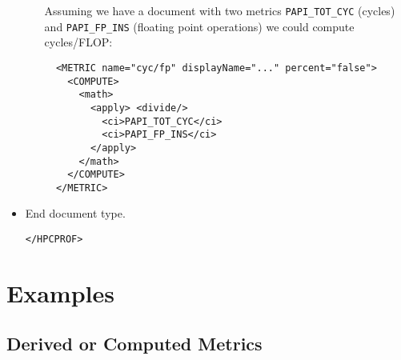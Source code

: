 \documentclass[english]{article}
\begin{document}
\begin{itemize}
\begin{itemize}
  Assuming we have a document with two metrics \verb+PAPI_TOT_CYC+ (cycles) and \verb+PAPI_FP_INS+ (floating point operations) we could compute cycles/FLOP:

  \begin{verbatim}
  <METRIC name="cyc/fp" displayName="..." percent="false">
    <COMPUTE>
      <math>
        <apply> <divide/>
          <ci>PAPI_TOT_CYC</ci>
          <ci>PAPI_FP_INS</ci>
        </apply>
      </math>
    </COMPUTE>
  </METRIC>
  \end{verbatim}

  \end{itemize} %

\item End document type.
  \begin{itemize}
  \verb+</HPCPROF>+
  \end{itemize}

\end{itemize}

\section{Examples}

\subsection{Derived or Computed Metrics}
\end{document}
